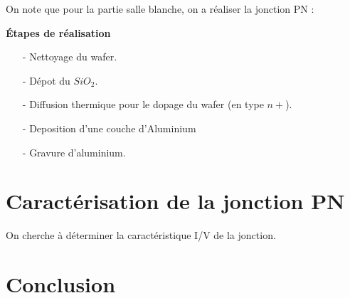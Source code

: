 \documentclass[11pt]{article}
\begin{document}
On note que pour la partie salle blanche, on a r\'ealiser la jonction PN :

\textbf{\'Etapes de r\'ealisation}
\begin{itemize}
\item[-] Nettoyage du wafer.
\item[-] D\'epot du $SiO_2$.
\item[-] Diffusion thermique pour le dopage du wafer (en type $n+$).
\item[-] Deposition d'une couche d'Aluminium
\item[-] Gravure d'aluminium.
\end{itemize}

\section{Caract\'erisation de la jonction PN}
On cherche \`a d\'eterminer la caract\'eristique I/V de la jonction.




\section{Conclusion}
\end{document}
